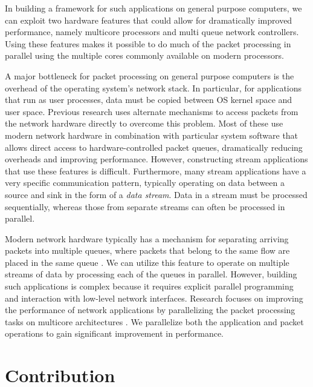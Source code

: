 \documentclass[conference]{IEEEtran}
\newcommand{\comment}[1]{}
\begin{document}
In building a framework for such applications on general purpose computers, we can exploit two hardware features that could allow for dramatically improved performance, namely multicore processors and multi queue network controllers. Using these features makes it possible to do much of the packet processing in parallel using the multiple cores commonly available on modern processors.

A major bottleneck for packet processing on general purpose computers is the overhead of the operating system's network stack. In particular, for applications that run as user processes, data must be copied between OS kernel space and user space. Previous research uses alternate mechanisms to access packets from the network hardware directly to overcome this problem\cite{Dobrescu09routebricks:exploiting}\cite{Han:2010:PGS:1851275.1851207}\cite{Kohler2000}. Most of these use modern network hardware in combination with particular system software that allows direct access to hardware-controlled packet queues, dramatically reducing overheads and improving performance. However, constructing stream applications that use these features is difficult. Furthermore, many stream applications have a very specific communication pattern, typically operating on data between a source and sink in the form of a \textit{data stream}. Data in a stream must be processed sequentially, whereas those from separate streams can often be processed in parallel.

Modern network hardware typically has a mechanism for separating arriving packets into multiple queues, where packets that belong to the same flow are\comment{ guaranteed to be} placed in the same queue\cite{micro2008} \cite{intel2010}. We can utilize this feature to operate on multiple streams of data by processing each of the queues in parallel. However, building such applications is complex because it requires explicit parallel programming and interaction with low-level network interfaces. Research focuses on improving the performance of network applications by parallelizing the packet processing tasks on multicore architectures \cite{Dobrescu09routebricks:exploiting} \cite{Han:2010:PGS:1851275.1851207}. We parallelize both the application and packet operations to gain significant improvement in performance.

\section{Contribution}
\end{document}
